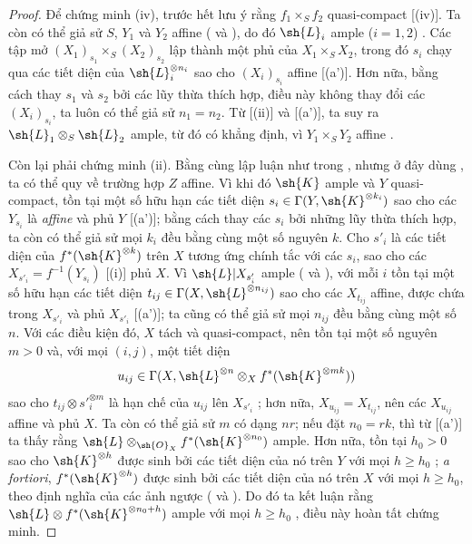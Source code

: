 \documentclass[oneside,10pt]{amsart}
\renewcommand{\geq}{\geqslant}
\newcommand{\oldpage}[2][]{\marginnote{\normalfont\footnotesize\textbf{#1}~|~#2}\ignorespaces}
\begin{document}
\begin{proof}
Để chứng minh (iv), trước hết lưu ý rằng $f_1\times_S f_2$ quasi-compact [(iv)].
Ta còn có thể giả sử $S$, $Y_1$ và $Y_2$ affine ( và ), do đó $\sh{L}_i$ ample ($i=1,2$) .
Các tập mở $(X_1)_{s_1}\times_S(X_2)_{s_2}$ lập thành một phủ của $X_1\times_S X_2$, trong đó $s_i$ chạy qua các tiết diện của $\sh{L}_i^{\otimes n_i}$ sao cho $(X_i)_{s_i}$ affine [(a')].
Hơn nữa, bằng cách thay $s_1$ và $s_2$ bởi các lũy thừa thích hợp, điều này không thay đổi các $(X_i)_{s_i}$, ta luôn có thể giả sử $n_1=n_2$.
Từ [(ii)] và [(a')], ta suy ra $\sh{L}_1\otimes_S\sh{L}_2$ ample, từ đó có khẳng định, vì $Y_1\times_S Y_2$ affine .

Còn lại phải chứng minh (ii).
Bằng cùng lập luận như trong , nhưng ở đây dùng , ta có thể quy về trường hợp $Z$ affine.
Vì khi đó $\sh{K}$ ample và $Y$ quasi-compact, tồn tại một số hữu hạn các tiết diện $s_i\in\Gamma(Y,\sh{K}^{\otimes k_i})$ sao cho các $Y_{s_i}$
\oldpage[II]{93}
là \emph{affine} và phủ $Y$ [(a')];
bằng cách thay các $s_i$ bởi những lũy thừa thích hợp, ta còn có thể giả sử mọi $k_i$ đều bằng cùng một số nguyên $k$.
Cho $s'_i$ là các tiết diện của $f^*(\sh{K}^{\otimes k})$ trên $X$ tương ứng chính tắc với các $s_i$, sao cho các $X_{s'_i}=f^{-1}(Y_{s_i})$ [(i)] phủ $X$.
Vì $\sh{L}|X_{s'_i}$ ample ( và ), với mỗi $i$ tồn tại một số hữu hạn các tiết diện $t_{ij}\in\Gamma(X,\sh{L}^{\otimes n_{ij}})$ sao cho các $X_{t_{ij}}$ affine, được chứa trong $X_{s'_i}$ và phủ $X_{s'_i}$ [(a')];
ta cũng có thể giả sử mọi $n_{ij}$ đều bằng cùng một số $n$.
Với các điều kiện đó, $X$ tách và quasi-compact, nên tồn tại một số nguyên $m>0$ và, với mọi $(i,j)$, một tiết diện
\[
  u_{ij}\in\Gamma(X,\sh{L}^{\otimes n}\otimes_X f^*(\sh{K}^{\otimes mk}))
\]
sao cho $t_{ij}\otimes s'^{\otimes m}_i$ là hạn chế của $u_{ij}$ lên $X_{s'_i}$ ;
hơn nữa, $X_{u_{ij}}=X_{t_{ij}}$, nên các $X_{u_{ij}}$ affine và phủ $X$.
Ta còn có thể giả sử $m$ có dạng $nr$;
nếu đặt $n_0=rk$, thì từ [(a')] ta thấy rằng $\sh{L}\otimes_{\sh{O}_X}f^*(\sh{K}^{\otimes n_0})$ ample.
Hơn nữa, tồn tại $h_0>0$ sao cho $\sh{K}^{\otimes h}$ được sinh bởi các tiết diện của nó trên $Y$ với mọi $h\geq h_0$ ;
\emph{a fortiori}, $f^*(\sh{K}^{\otimes h})$ được sinh bởi các tiết diện của nó trên $X$ với mọi $h\geq h_0$, theo định nghĩa của các ảnh ngược ( và ).
Do đó ta kết luận rằng $\sh{L}\otimes f^*(\sh{K}^{\otimes n_0+h})$ ample với mọi $h\geq h_0$ , điều này hoàn tất chứng minh.
\end{proof}
\end{document}
